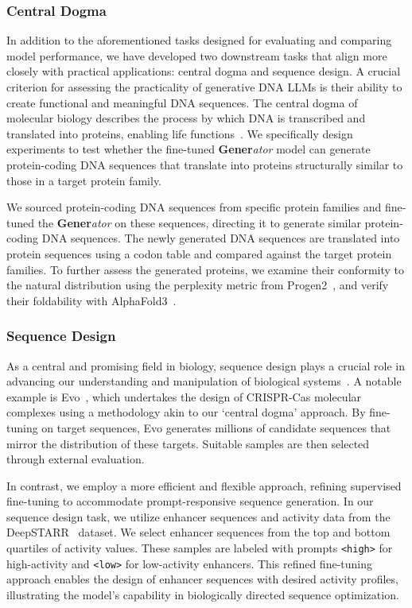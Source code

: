 \subsubsection{Central Dogma}
In addition to the aforementioned tasks designed for evaluating and comparing model performance, we have developed two downstream tasks that align more closely with practical applications: central dogma and sequence design. A crucial criterion for assessing the practicality of generative DNA LLMs is their ability to create functional and meaningful DNA sequences. The central dogma of molecular biology describes the process by which DNA is transcribed and translated into proteins, enabling life functions~\cite{central-dogma}. We specifically design experiments to test whether the fine-tuned \textbf{Gener}\textit{ator} model can generate protein-coding DNA sequences that translate into proteins structurally similar to those in a target protein family.

We sourced protein-coding DNA sequences from specific protein families and fine-tuned the \textbf{Gener}\textit{ator} on these sequences, directing it to generate similar protein-coding DNA sequences. The newly generated DNA sequences are translated into protein sequences using a codon table and compared against the target protein families. To further assess the generated proteins, we examine their conformity to the natural distribution using the perplexity metric from Progen2~\cite{progen2}, and verify their foldability with AlphaFold3~\cite{AlphaFold3}.

\subsubsection{Sequence Design}
\label{sec:sequence_design}
As a central and promising field in biology, sequence design plays a crucial role in advancing our understanding and manipulation of biological systems~\cite{sequence-design,protein-design}. A notable example is Evo~\cite{Evo}, which undertakes the design of CRISPR-Cas molecular complexes using a methodology akin to our `central dogma' approach. By fine-tuning on target sequences, Evo generates millions of candidate sequences that mirror the distribution of these targets. Suitable samples are then selected through external evaluation.

In contrast, we employ a more efficient and flexible approach, refining supervised fine-tuning to accommodate prompt-responsive sequence generation. In our sequence design task, we utilize enhancer sequences and activity data from the DeepSTARR~\cite{DeepSTARR} dataset. We select enhancer sequences from the top and bottom quartiles of activity values. These samples are labeled with prompts \texttt{<high>} for high-activity and \texttt{<low>} for low-activity enhancers. This refined fine-tuning approach enables the design of enhancer sequences with desired activity profiles, illustrating the model's capability in biologically directed sequence optimization.
